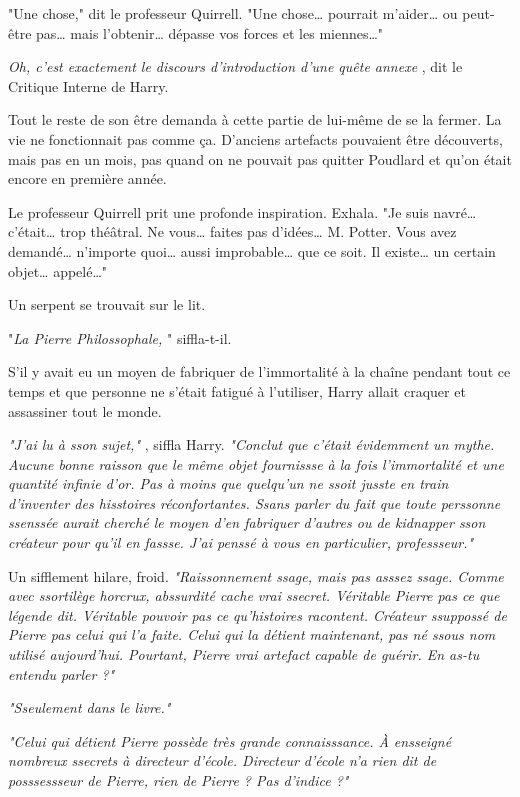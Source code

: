 "Une chose," dit le professeur Quirrell. "Une chose… pourrait m'aider… ou peut-être pas… mais l'obtenir… dépasse vos forces et les miennes…"

\emph{Oh, c'est exactement le discours d'introduction d'une quête annexe} , dit le Critique Interne de Harry.

Tout le reste de son être demanda à cette partie de lui-même de se la fermer. La vie ne fonctionnait pas comme ça. D'anciens artefacts pouvaient être découverts, mais pas en un mois, pas quand on ne pouvait pas quitter Poudlard et qu'on était encore en première année.

Le professeur Quirrell prit une profonde inspiration. Exhala. "Je suis navré… c'était… trop théâtral. Ne vous… faites pas d'idées… M. Potter. Vous avez demandé… n'importe quoi… aussi improbable… que ce soit. Il existe… un certain objet… appelé…"

Un serpent se trouvait sur le lit.

"\emph{La Pierre Philossophale,} " siffla-t-il.

S'il y avait eu un moyen de fabriquer de l'immortalité à la chaîne pendant tout ce temps et que personne ne s'était fatigué à l'utiliser, Harry allait craquer et assassiner tout le monde.

\emph{"J'ai lu à sson sujet,"} , siffla Harry. \emph{"Conclut que c'était évidemment un mythe. Aucune bonne raisson que le même objet fournissse à la fois l'immortalité et une quantité infinie d'or. Pas à moins que quelqu'un ne ssoit jusste en train d'inventer des hisstoires réconfortantes. Ssans parler du fait que toute perssonne ssenssée aurait cherché le moyen d'en fabriquer d'autres ou de kidnapper sson créateur pour qu'il en fassse. J'ai penssé à vous en particulier, professseur."} 

Un sifflement hilare, froid. \emph{"Raissonnement ssage, mais pas asssez ssage. Comme avec ssortilège horcrux, abssurdité cache vrai ssecret. Véritable Pierre pas ce que légende dit. Véritable pouvoir pas ce qu'histoires racontent. Créateur ssuppossé de Pierre pas celui qui l'a faite. Celui qui la détient maintenant, pas né ssous nom utilisé aujourd'hui. Pourtant, Pierre vrai artefact capable de guérir. En as-tu entendu parler ?"} 

\emph{"Sseulement dans le livre."} 

\emph{"Celui qui détient Pierre possède très grande connaisssance. À ensseigné nombreux ssecrets à directeur d'école. Directeur d'école n'a rien dit de posssessseur de Pierre, rien de Pierre ? Pas d'indice ?"} 

